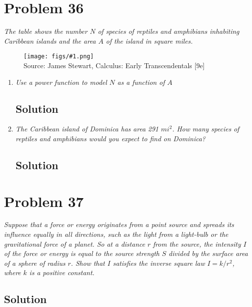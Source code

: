 \documentclass[11pt]{article}
\newcommand{\soln}{\subsection*}
\newcommand{\qn}{\textit}
\newcommand{\imagesource}[1]{{\footnotesize Source: #1}}
\newcommand{\imgqn}[1]{
	\begin{figure}[H]
		\centering
		\texttt{[image: figs/\#1.png]}\\
		\imagesource{James Stewart, Calculus: Early Transcendentals [9e]}
	\end{figure}
}
\begin{document}
\section*{Problem 36}

\qn{The table shows the number $N$ of species of reptiles and amphibians inhabiting Caribbean islands and the area $A$ of the island in square miles.}

\imgqn{1.2.36}

\begin{enumerate}
	\item \qn{Use a power function to model $N$ as a function of $A$}
	\soln{Solution}
	
	\item \qn{The Caribbean island of Dominica has area 291 $mi^2$. How many species of reptiles and amphibians would you expect to find on Dominica?}
	\soln{Solution}
\end{enumerate}

\section*{Problem 37}

\qn{Suppose that a force or energy originates from a point source and spreads its influence equally in all directions, such as the light from a light-bulb or the gravitational force of a planet. So at a distance $r$ from the source, the intensity $I$ of the force or energy is equal to the source strength $S$ divided by the surface area of a sphere of radius $r$. Show that $I$ satisfies the inverse square law $I=k/r^2$, where $k$ is a positive constant.}

\soln{Solution}
\end{document}
